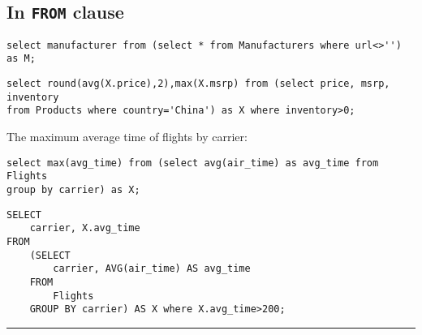 \documentclass{article}
\begin{document}
  







\subsection*{In \texttt{FROM} clause}

\begin{lstlisting}[frame=single]    
select manufacturer from (select * from Manufacturers where url<>'') as M;
\end{lstlisting}   


\begin{lstlisting}[frame=single]    
select round(avg(X.price),2),max(X.msrp) from (select price, msrp, inventory
from Products where country='China') as X where inventory>0;

\end{lstlisting}   





   

The maximum average time of flights by carrier:

\begin{lstlisting}[frame=single]  
select max(avg_time) from (select avg(air_time) as avg_time from Flights
group by carrier) as X;
\end{lstlisting} 

  
  
  
  
\begin{lstlisting}[frame=single]
SELECT 
    carrier, X.avg_time
FROM
    (SELECT 
        carrier, AVG(air_time) AS avg_time
    FROM
        Flights
    GROUP BY carrier) AS X where X.avg_time>200;
\end{lstlisting}    
    
  
  
  
  
\hspace{-0.5cm}\rule[-0.101in]{\textwidth}{0.0025in}
    
  
  
  
  
  
  
  
  
  
  
  
  
\end{document}
